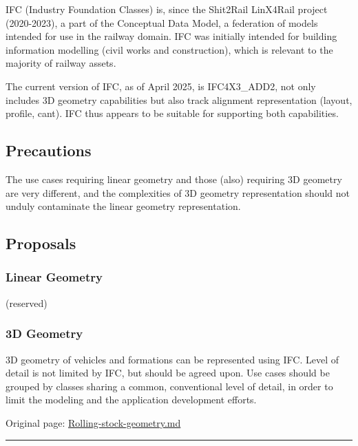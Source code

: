 \documentclass[
  11pt,
]{article}
\begin{document}
IFC (Industry Foundation Classes) is, since the Shit2Rail LinX4Rail
project (2020-2023), a part of the Conceptual Data Model, a federation
of models intended for use in the railway domain. IFC was initially
intended for building information modelling (civil works and
construction), which is relevant to the majority of railway assets.

The current version of IFC, as of April 2025, is IFC4X3\_ADD2, not only
includes 3D geometry capabilities but also track alignment
representation (layout, profile, cant). IFC thus appears to be suitable
for supporting both capabilities.

\hypertarget{precautions}{%
\subsection{Precautions}\label{precautions}}

The use cases requiring linear geometry and those (also) requiring 3D
geometry are very different, and the complexities of 3D geometry
representation should not unduly contaminate the linear geometry
representation.

\hypertarget{proposals}{%
\subsection{Proposals}\label{proposals}}

\hypertarget{linear-geometry}{%
\subsubsection{Linear Geometry}\label{linear-geometry}}

(reserved)

\hypertarget{d-geometry}{%
\subsubsection{3D Geometry}\label{d-geometry}}

3D geometry of vehicles and formations can be represented using IFC.
Level of detail is not limited by IFC, but should be agreed upon. Use
cases should be grouped by classes sharing a common, conventional level
of detail, in order to limit the modeling and the application
development efforts.

Original page:
\href{https://github.com/UICrail/CDM-RSM/wiki/Rolling-stock-geometry}{Rolling-stock-geometry.md}

\begin{center}\rule{0.5\linewidth}{0.5pt}\end{center}
\end{document}
